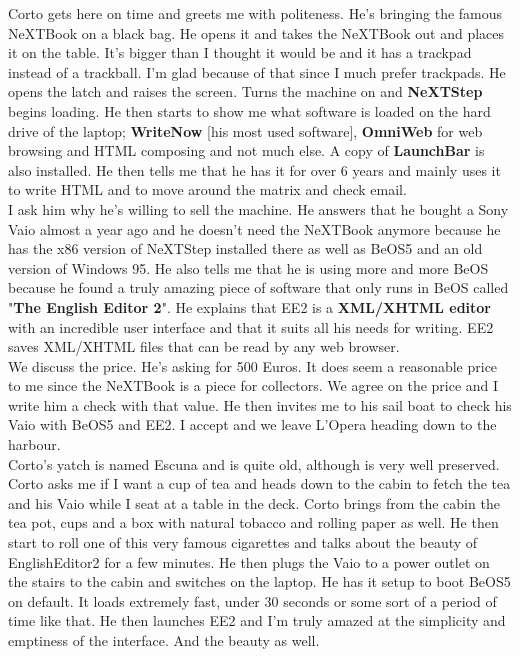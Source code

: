 \documentclass[11pt,twoside,a4paper]{book}
\begin{document}
\begin{multicols*}{2}
Corto gets here on time and greets me with politeness. He's bringing the famous NeXTBook on a black bag. He opens it and takes the NeXTBook out and places it on the table. It's bigger than I thought it would be and it has a trackpad instead of a trackball. I'm glad because of that since I much prefer trackpads. He opens the latch and raises the screen. Turns the machine on and \textbf{NeXTStep} begins loading. He then starts to show me what software is loaded on the hard drive of the laptop; \textbf{WriteNow} [his most used software], \textbf{OmniWeb} for web browsing and HTML composing and not much else. A copy of \textbf{LaunchBar} is also installed. He then tells me that he has it for over 6 years and mainly uses it to write HTML and to move around the matrix and check email. ~\\

I ask him why he's willing to sell the machine. He answers that he bought a Sony Vaio almost a year ago and he doesn't need the NeXTBook anymore because he has the x86 version of NeXTStep installed there as well as BeOS5 and an old version of Windows 95. He also tells me that he is using more and more BeOS because he found a truly amazing piece of software that only runs in BeOS called "\textbf{The English Editor 2}". He explains that EE2 is a \textbf{XML/XHTML editor} with an incredible user interface and that it suits all his needs for writing. EE2 saves XML/XHTML files that can be read by any web browser. ~\\

We discuss the price. He's asking for 500 Euros. It does seem a reasonable price to me since the NeXTBook is a piece for collectors. We agree on the price and I write him a check with that value. He then invites me to his sail boat to check his Vaio with BeOS5 and EE2. I accept and we leave L'Opera heading down to the harbour. ~\\

Corto's yatch is named Escuna and is quite old, although is very well preserved. Corto asks me if I want a cup of tea and heads down to the cabin to fetch the tea and his Vaio while I seat at a table in the deck. Corto brings from the cabin the tea pot, cups and a box with natural tobacco and rolling paper as well. He then start to roll one of this very famous cigarettes and talks about the beauty of EnglishEditor2 for a few minutes. He then plugs the Vaio to a power outlet on the stairs to the cabin and switches on the laptop. He has it setup to boot BeOS5 on default. It loads extremely fast, under 30 seconds or some sort of a period of time like that. He then launches EE2 and I'm truly amazed at the simplicity and emptiness of the interface. And the beauty as well. ~\\


\end{multicols*}
\end{document}
